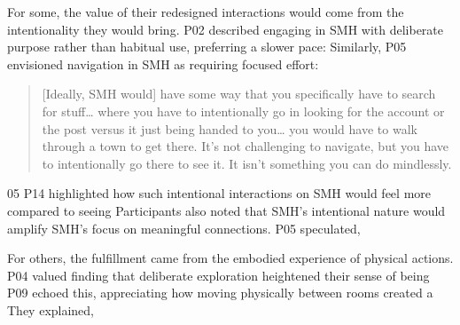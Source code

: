 For some, the value of their redesigned interactions would come from the intentionality they would bring. P02 described engaging in SMH with deliberate purpose rather than habitual use, preferring a slower pace:  Similarly, P05 envisioned navigation in SMH as requiring focused effort: \blockquote{[Ideally, SMH would] have some way that you specifically have to search for stuff\ldots{} where you have to intentionally go in looking for the account or the post versus it just being handed to you\ldots{} you would have to walk through a town to get there. It's not challenging to navigate, but you have to intentionally go there to see it. It isn't something you can do mindlessly.}{05}
P14 highlighted how such intentional interactions on SMH would feel more  compared to seeing  Participants also noted that SMH's intentional nature would amplify SMH's focus on meaningful connections. P05 speculated,  

For others, the fulfillment came from the embodied experience of physical actions. P04 valued  finding that deliberate exploration heightened their sense of being  P09 echoed this, appreciating how moving physically between rooms created a  They explained,  


